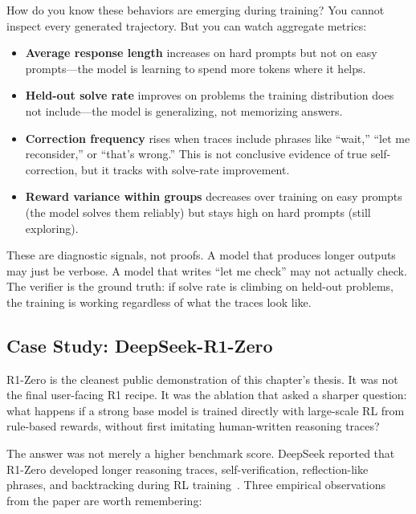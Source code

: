 How do you know these behaviors are emerging during training? You cannot inspect every generated trajectory. But you can watch aggregate metrics:

\begin{itemize}[nosep]
  \item \textbf{Average response length} increases on hard prompts but not on easy prompts---the model is learning to spend more tokens where it helps.
  \item \textbf{Held-out solve rate} improves on problems the training distribution does not include---the model is generalizing, not memorizing answers.
  \item \textbf{Correction frequency} rises when traces include phrases like ``wait,'' ``let me reconsider,'' or ``that's wrong.'' This is not conclusive evidence of true self-correction, but it tracks with solve-rate improvement.
  \item \textbf{Reward variance within groups} decreases over training on easy prompts (the model solves them reliably) but stays high on hard prompts (still exploring).
\end{itemize}

These are diagnostic signals, not proofs. A model that produces longer outputs may just be verbose. A model that writes ``let me check'' may not actually check. The verifier is the ground truth: if solve rate is climbing on held-out problems, the training is working regardless of what the traces look like.

\subsection{Case Study: DeepSeek-R1-Zero}

R1-Zero is the cleanest public demonstration of this chapter's thesis. It was not the final user-facing R1 recipe. It was the ablation that asked a sharper question: what happens if a strong base model is trained directly with large-scale RL from rule-based rewards, without first imitating human-written reasoning traces?

The answer was not merely a higher benchmark score. DeepSeek reported that R1-Zero developed longer reasoning traces, self-verification, reflection-like phrases, and backtracking during RL training~\cite{deepseekai2025r1}. Three empirical observations from the paper are worth remembering:

